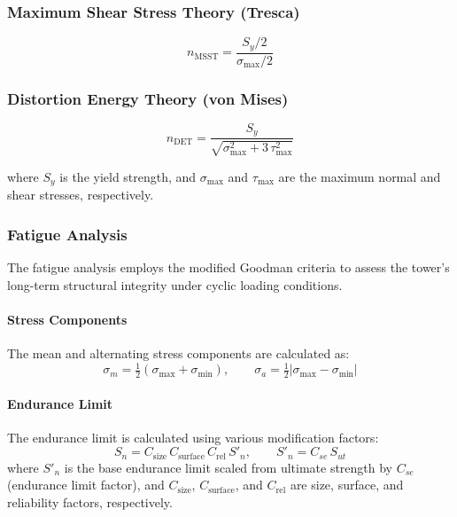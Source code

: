 \documentclass[11pt]{article}
\begin{document}
\subsubsection*{Maximum Shear Stress Theory (Tresca)}
\begin{equation}
 n_{\text{MSST}} = \frac{S_y/2}{\sigma_\text{max}/2}
\label{eq:msst}
\end{equation}

\subsubsection*{Distortion Energy Theory (von Mises)}
\begin{equation}
 n_{\text{DET}} = \frac{S_y}{\sqrt{\sigma_\text{max}^{2} + 3\,\tau_\text{max}^{2}}}
\label{eq:det}
\end{equation}

where $S_y$ is the yield strength, and $\sigma_\text{max}$ and $\tau_\text{max}$ are the maximum normal and shear stresses, respectively.

\subsubsection{Fatigue Analysis}

The fatigue analysis employs the modified Goodman criteria to assess the tower's long-term structural integrity under cyclic loading conditions.

\paragraph{Stress Components}

The mean and alternating stress components are calculated as:
\begin{equation}
 \sigma_m = \tfrac{1}{2}(\sigma_{\text{max}}+\sigma_{\text{min}}), \qquad \sigma_a = \tfrac{1}{2}|\sigma_{\text{max}}-\sigma_{\text{min}}|
\label{eq:mean_alt}
\end{equation}

\paragraph{Endurance Limit}

The endurance limit is calculated using various modification factors:
\begin{equation}
 S_n = C_{\text{size}}\,C_{\text{surface}}\,C_{\text{rel}}\,S'_n, \qquad S'_n = C_{se}\,S_{ut}
\label{eq:Sn}
\end{equation}
where $S'_n$ is the base endurance limit scaled from ultimate strength by $C_{se}$ (endurance limit factor), and $C_{\text{size}}$, $C_{\text{surface}}$, and $C_{\text{rel}}$ are size, surface, and reliability factors, respectively.
\end{document}
